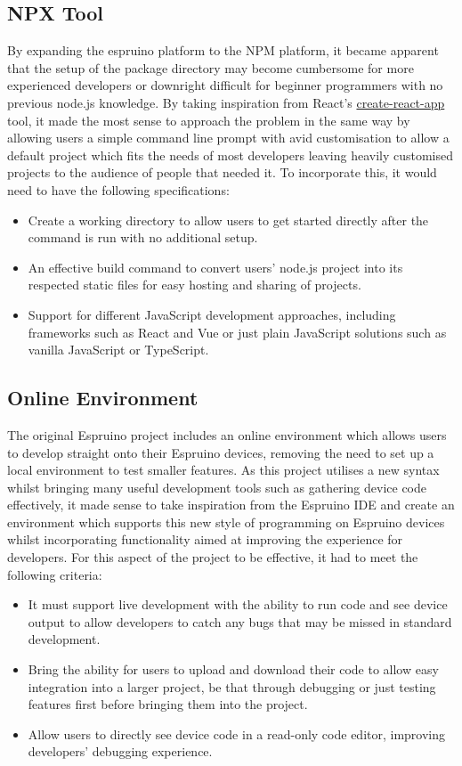 \documentclass{l4proj}
\begin{document}
\subsection{NPX Tool}
\text By expanding the espruino platform to the NPM platform, it became apparent that the setup of the package directory may become cumbersome for more experienced developers or downright difficult for beginner programmers with no previous node.js knowledge. By taking inspiration from React's \href{https://reactjs.org/docs/create-a-new-react-app.html}{create-react-app} tool, it made the most sense to approach the problem in the same way by allowing users a simple command line prompt with avid customisation to allow a default project which fits the needs of most developers leaving heavily customised projects to the audience of people that needed it. To incorporate this, it would need to have the following specifications:
\\
\begin{itemize}
    \item Create a working directory to allow users to get started directly after the command is run with no additional setup.
    \item An effective build command to convert users' node.js project into its respected static files for easy hosting and sharing of projects.
    \item Support for different JavaScript development approaches, including frameworks such as React and Vue or just plain JavaScript solutions such as vanilla JavaScript or TypeScript.
\end{itemize}

\subsection{Online Environment}
\text The original Espruino project includes an online environment which allows users to develop straight onto their Espruino devices, removing the need to set up a local environment to test smaller features. As this project utilises a new syntax whilst bringing many useful development tools such as gathering device code effectively, it made sense to take inspiration from the Espruino IDE and create an environment which supports this new style of programming on Espruino devices whilst incorporating functionality aimed at improving the experience for developers. For this aspect of the project to be effective, it had to meet the following criteria:
\\
\begin{itemize}
    \item It must support live development with the ability to run code and see device output to allow developers to catch any bugs that may be missed in standard development.
    \item Bring the ability for users to upload and download their code to allow easy integration into a larger project, be that through debugging or just testing features first before bringing them into the project.
    \item Allow users to directly see device code in a read-only code editor, improving developers' debugging experience.
\end{itemize}
\end{document}
